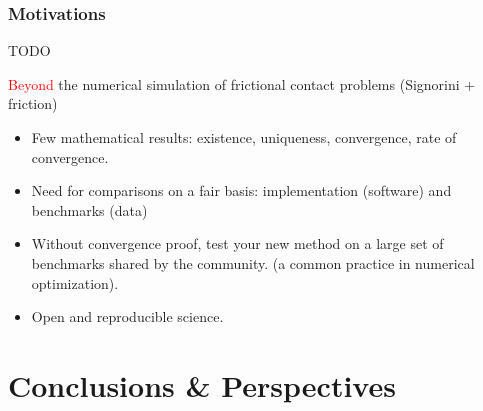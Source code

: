 \documentclass[8pt,red]{beamer}
\renewcommand{\tr}[1]{\textcolor{red}{#1}}
\begin{document}
\begin{frame}
  \frametitle{Motivations}
  TODO

  
  \tr{Beyond} the numerical simulation of frictional contact problems (Signorini + friction)
  \begin{itemize}
  \item Few mathematical results: existence, uniqueness, convergence, rate of convergence.
  \item Need for comparisons on a fair basis: implementation (software) and benchmarks (data)
  \item Without convergence proof, test your new  method on a large set of  benchmarks shared by the community. (a common practice in numerical optimization).
  \item Open and reproducible science.
  \end{itemize}
\end{frame}

\frame{\tableofcontents}


%


\frame{\tableofcontents}


\frame{\tableofcontents}


\frame{\tableofcontents}



%

%




\frame{\tableofcontents}







\section{Conclusions \& Perspectives}
\end{document}
